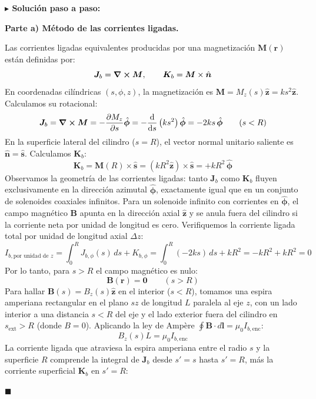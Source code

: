 \documentclass[11pt,a4paper]{book}
\newenvironment{solucion}{%
    \par\medskip\noindent\textbf{\color{blue!65!black}\Large $\blacktriangleright$ Solución paso a paso:}\par\medskip
}{%
    \hfill$\blacksquare$\par\bigskip
}
\newcommand{\phihat}{\hat{\bm{\phi}}}
\newcommand{\shat}{\hat{\bm{s}}}
\newcommand{\zhat}{\hat{\bm{z}}}
\newcommand{\nhat}{\hat{\bm{n}}}
\newcommand{\Bvec}{\bm{B}}
\newcommand{\Mvec}{\bm{M}}
\newcommand{\Jvec}{\bm{J}}
\begin{document}
\begin{solucion}
\textbf{Parte a) Método de las corrientes ligadas.}

Las corrientes ligadas equivalentes producidas por una magnetización $\Mvec(\bm{r})$ están definidas por:
\begin{equation}
    \Jvec_b = \curl{\Mvec}, \qquad \bm{K}_b = \Mvec \times \nhat
\end{equation}
En coordenadas cilíndricas $(s,\phi,z)$, la magnetización es $\Mvec = M_z(s)\zhat = k s^2 \zhat$. Calculamos su rotacional:
\begin{equation}
    \Jvec_b = \curl{\Mvec} = -\pdv{M_z}{s}\phihat = -\dv{}{s}\left(k s^2\right)\phihat = -2 k s \,\phihat \qquad (s < R)
\end{equation}
En la superficie lateral del cilindro ($s = R$), el vector normal unitario saliente es $\nhat = \shat$. Calculamos $\bm{K}_b$:
\begin{equation}
    \bm{K}_b = \Mvec(R) \times \shat = \left(k R^2 \zhat\right) \times \shat = +k R^2 \,\phihat
\end{equation}
Observamos la geometría de las corrientes ligadas: tanto $\Jvec_b$ como $\bm{K}_b$ fluyen exclusivamente en la dirección azimutal $\phihat$, exactamente igual que en un conjunto de solenoides coaxiales infinitos. Para un solenoide infinito con corrientes en $\phihat$, el campo magnético $\Bvec$ apunta en la dirección axial $\zhat$ y se anula fuera del cilindro si la corriente neta por unidad de longitud es cero. Verifiquemos la corriente ligada total por unidad de longitud axial $\Delta z$:
\begin{equation}
    I_{b,\text{por unidad de }z} = \int_{0}^{R} J_{b,\phi}(s)\,ds + K_{b,\phi} = \int_{0}^{R} (-2ks)\,ds + k R^2 = -k R^2 + k R^2 = 0
\end{equation}
Por lo tanto, para $s > R$ el campo magnético es nulo:
\begin{equation}
    \Bvec(\bm{r}) = \bm{0} \qquad (s > R)
\end{equation}
Para hallar $\Bvec(s) = B_z(s)\zhat$ en el interior ($s < R$), tomamos una espira amperiana rectangular en el plano $sz$ de longitud $L$ paralela al eje $z$, con un lado interior a una distancia $s < R$ del eje y el lado exterior fuera del cilindro en $s_{\text{ext}} > R$ (donde $B = 0$). Aplicando la ley de Ampère $\oint \Bvec \cdot d\bm{l} = \mu_0 I_{b,\text{enc}}$:
\begin{equation}
    B_z(s) L = \mu_0 I_{b,\text{enc}}
\end{equation}
La corriente ligada que atraviesa la espira amperiana entre el radio $s$ y la superficie $R$ comprende la integral de $\Jvec_b$ desde $s' = s$ hasta $s' = R$, más la corriente superficial $\bm{K}_b$ en $s'=R$:

\end{solucion}
\end{document}
